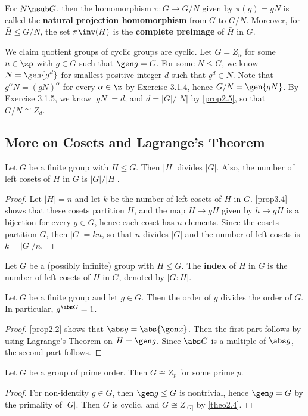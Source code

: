  For $N \nsub G$, then the homomorphism $\pi : G \to G/N$ given by $\pi(g) = gN$ is called the \textbf{natural projection homomorphism} from $G$ to $G/N$. Moreover, for $\bar H \leq G/N$, the set $\pi\inv(\bar H)$ is the \textbf{complete preimage} of $\bar H$ in $G$.

\note We claim quotient groups of cyclic groups are cyclic. Let $G = Z_n$ for some $n \in \zp$ with $g \in G$ such that $\gen g = G$. For some $N \leq G$, we know $N = \gen{g^d}$ for smallest positive integer $d$ such that $g^d \in N$. Note that $g^\alpha N = (gN)^\alpha$ for every $\alpha \in \z$ by Exercise 3.1.4, hence $G/N = \gen{gN}$. By Exercise 3.1.5, we know $|gN| = d$, and $d = |G|/|N|$ by \autoref{prop2.5}, so that $G/N \cong Z_d$.
\newpage

\subsection{More on Cosets and Lagrange's Theorem} \label{sec3.2}

 \label{theo3.8}
Let $G$ be a finite group with $H \leq G$. Then $|H|$ divides $|G|$. Also, the number of left cosets of $H$ in $G$ is $|G|/|H|$.
\begin{proof}
    Let $|H| = n$ and let $k$ be the number of left cosets of $H$ in $G$. \autoref{prop3.4} shows that these cosets partition $H$, and the map $H \to gH$ given by $h \mapsto gH$ is a bijection for every $g \in G$, hence each coset has $n$ elements. Since the cosets partition $G$, then $|G| = kn$, so that $n$ divides $|G|$ and the number of left cosets is $k = |G|/n$.
\end{proof}

 Let $G$ be a (possibly infinite) group with $H \leq G$. The \textbf{index} of $H$ in $G$ is the number of left cosets of $H$ in $G$, denoted by $|G : H|$.

 \label{cor3.9}
Let $G$ be a finite group and let $g \in G$. Then the order of $g$ divides the order of $G$. In particular, $g^{\abs G} = 1$.
\begin{proof}
    \autoref{prop2.2} shows that $\abs g = \abs{\gen x}$. Then the first part follows by using Lagrange's Theorem on $H = \gen g$. Since $\abs G$ is a multiple of $\abs g$, the second part follows.
\end{proof}

 \label{cor3.10}
Let $G$ be a group of prime order. Then $G \cong Z_p$ for some prime $p$.
\begin{proof}
    For non-identity $g \in G$, then $\gen g \leq G$ is nontrivial, hence $\gen g = G$ by the primality of $|G|$. Then $G$ is cyclic, and $G \cong Z_{|G|}$ by \autoref{theo2.4}.
\end{proof}

